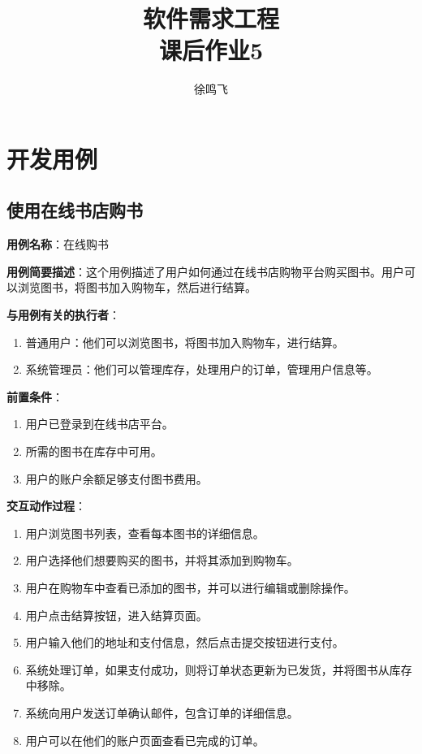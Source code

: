\documentclass[11pt, a4paper, oneside]{ctexbook}
\title{{\Huge{\textbf{软件需求工程}}}\\课后作业5}
\author{徐鸣飞}
\date{}
\begin{document}
\maketitle
{}
\setcounter{page}{1}
\newpage
{}
\setcounter{page}{1}
\tableofcontents
\newpage
\setcounter{page}{1}

\chapter{开发用例}
\section{使用在线书店购书}
\textbf{用例名称}：在线购书

\textbf{用例简要描述}：这个用例描述了用户如何通过在线书店购物平台购买图书。用户可以浏览图书，将图书加入购物车，然后进行结算。

\textbf{与用例有关的执行者}：
\begin{enumerate}
    \item 普通用户：他们可以浏览图书，将图书加入购物车，进行结算。
    \item 系统管理员：他们可以管理库存，处理用户的订单，管理用户信息等。
\end{enumerate}

\textbf{前置条件}：
\begin{enumerate}
    \item 用户已登录到在线书店平台。
    \item 所需的图书在库存中可用。
    \item 用户的账户余额足够支付图书费用。
\end{enumerate}

\textbf{交互动作过程}：
\begin{enumerate}
    \item 用户浏览图书列表，查看每本图书的详细信息。
    \item 用户选择他们想要购买的图书，并将其添加到购物车。
    \item 用户在购物车中查看已添加的图书，并可以进行编辑或删除操作。
    \item 用户点击结算按钮，进入结算页面。
    \item 用户输入他们的地址和支付信息，然后点击提交按钮进行支付。
    \item 系统处理订单，如果支付成功，则将订单状态更新为已发货，并将图书从库存中移除。
    \item 系统向用户发送订单确认邮件，包含订单的详细信息。
    \item 用户可以在他们的账户页面查看已完成的订单。
\end{enumerate}
\end{document}
